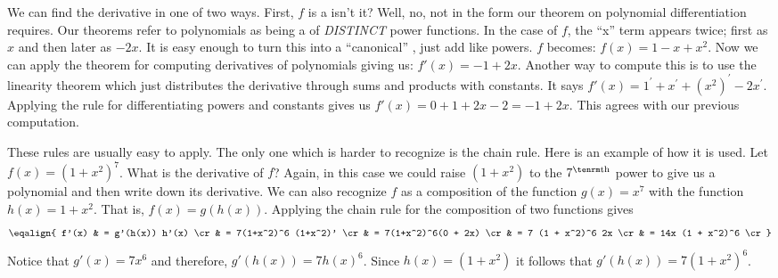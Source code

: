 
We can find 
the derivative in one of two ways. First, $f$ is a  isn't it? 
Well, no, not in the form our theorem on polynomial differentiation requires. Our theorems refer 
to polynomials as being a  of {\it DISTINCT\/} power functions.
In the case of $f$, the ``x'' 
term appears twice; first as $x$ and then later as $-2x$. It is easy enough 
to turn this into a ``canonical'' , just add like powers. 
$f$ becomes: $f(x) = 1 - x + x^2$. Now we can apply the theorem for 
computing derivatives of polynomials giving us: $f'(x) = -1 + 2x$.
Another way to compute this is to use the linearity theorem which just 
distributes the derivative through sums and products with constants. It says
$f'(x) = 1^\prime + x^\prime + (x^2)^\prime - 2x^\prime$. 
Applying the rule for differentiating powers and constants 
gives us $f'(x) = 0 + 1 + 2x - 2 = -1 + 2x$. This agrees with our 
previous computation.

These rules are usually easy to apply. The only one which is harder to recognize
is the chain rule. Here is an example of how it is used. Let 
$f(x) = (1 + x^2)^7$. What is the derivative of $f$? Again, in this case we 
could raise $(1 + x^2)$ to the $7^{\rm th}$ power to give us a 
polynomial and then
write down its derivative. We can also recognize $f$ 
as a composition of the function $g(x) = x^7$ with the function 
$h(x) = 1 + x^2$. That is, $f(x) = g(h(x))$. Applying the chain rule for the 
composition of two functions gives
$$
\eqalign{
f'(x) & = g'(h(x))    h'(x) \cr
      & = 7(1+x^2)^6 (1+x^2)' \cr
      & = 7(1+x^2)^6(0 + 2x) \cr
      & = 7 (1 + x^2)^6 2x  \cr
      & = 14x (1 + x^2)^6 \cr
}
$$
Notice that $g'(x) = 7x^6$ and therefore, $g'(h(x)) = 7h(x)^6$. Since
$h(x) = (1 + x^2)$ it follows that $g'(h(x)) = 7 (1 + x^2)^6$.


